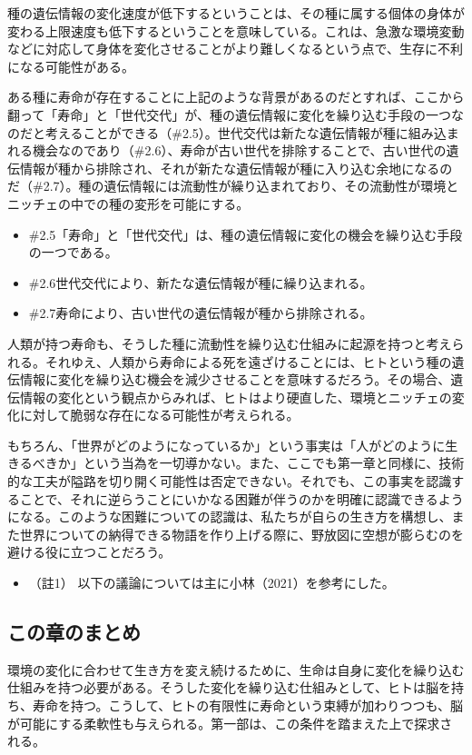 種の遺伝情報の変化速度が低下するということは、その種に属する個体の身体が変わる上限速度も低下するということを意味している。これは、急激な環境変動などに対応して身体を変化させることがより難しくなるという点で、生存に不利になる可能性がある。

ある種に寿命が存在することに上記のような背景があるのだとすれば、ここから翻って「寿命」と「世代交代」が、種の遺伝情報に変化を繰り込む手段の一つなのだと考えることができる（\#2.5）。世代交代は新たな遺伝情報が種に組み込まれる機会なのであり（\#2.6）、寿命が古い世代を排除することで、古い世代の遺伝情報が種から排除され、それが新たな遺伝情報が種に入り込む余地になるのだ（\#2.7）。種の遺伝情報には流動性が繰り込まれており、その流動性が環境とニッチェの中での種の変形を可能にする。

\begin{note}{}
  \begin{itemize}
    \tightlist
    \item{\#2.5}「寿命」と「世代交代」は、種の遺伝情報に変化の機会を繰り込む手段の一つである。
    \item{\#2.6}世代交代により、新たな遺伝情報が種に繰り込まれる。
    \item{\#2.7}寿命により、古い世代の遺伝情報が種から排除される。
  \end{itemize}
\end{note}

人類が持つ寿命も、そうした種に流動性を繰り込む仕組みに起源を持つと考えられる。それゆえ、人類から寿命による死を遠ざけることには、ヒトという種の遺伝情報に変化を繰り込む機会を減少させることを意味するだろう。その場合、遺伝情報の変化という観点からみれば、ヒトはより硬直した、環境とニッチェの変化に対して脆弱な存在になる可能性が考えられる。

もちろん、「世界がどのようになっているか」という事実は「人がどのように生きるべきか」という当為を一切導かない。また、ここでも第一章と同様に、技術的な工夫が隘路を切り開く可能性は否定できない。それでも、この事実を認識することで、それに逆らうことにいかなる困難が伴うのかを明確に認識できるようになる。このような困難についての認識は、私たちが自らの生き方を構想し、また世界についての納得できる物語を作り上げる際に、野放図に空想が膨らむのを避ける役に立つことだろう。

\begin{itemize}
\tightlist
\item
  （註1）
  以下の議論については主に小林（2021）\cite{Kobayashi}を参考にした。
\end{itemize}

\subsection{この章のまとめ}\label{ux3053ux306eux7ae0ux306eux307eux3068ux3081}

環境の変化に合わせて生き方を変え続けるために、生命は自身に変化を繰り込む仕組みを持つ必要がある。そうした変化を繰り込む仕組みとして、ヒトは脳を持ち、寿命を持つ。こうして、ヒトの有限性に寿命という束縛が加わりつつも、脳が可能にする柔軟性も与えられる。第一部は、この条件を踏まえた上で探求される。
